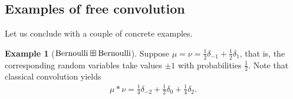 \documentclass[letterpaper,11pt,oneside,reqno]{amsart}
\numberwithin{equation}{section}
\theoremstyle{definition}
\newtheorem{example}[proposition]{Example}
\begin{document}

\subsection{Examples of free convolution} %
\label{sub:examples_of_free_convolutions}

Let us conclude with a couple of concrete examples.

\begin{example}[$\textnormal{Bernoulli}\boxplus \textnormal{Bernoulli}$]
Suppose $\mu=\nu=\frac{1}{2}\delta_{-1}+\frac{1}{2}\delta_1$,
that is, the corresponding random variables take values $\pm1$
with probabilities $\frac12$.
Note that classical convolution yields
\begin{align*}
    \mu*\nu=\frac{1}{4}\delta_{-2}+\frac{1}{2}\delta_0+\frac{1}{4}\delta_2.
\end{align*}


\end{example}
\end{document}
